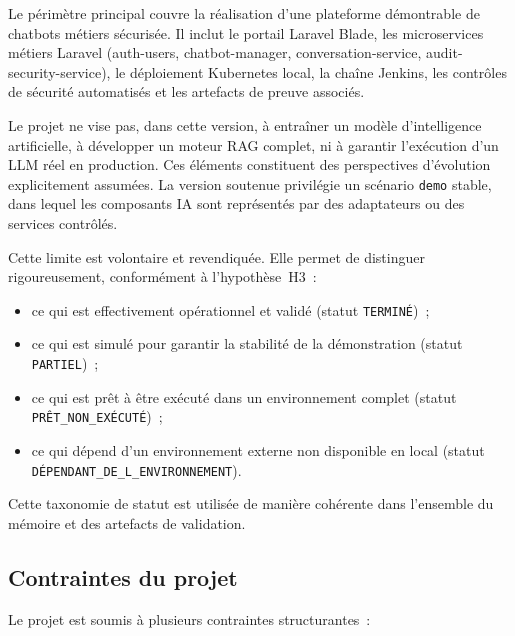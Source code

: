 Le périmètre principal couvre la réalisation d'une plateforme démontrable de chatbots métiers sécurisée. Il inclut le portail Laravel Blade, les microservices métiers Laravel (auth-users, chatbot-manager, conversation-service, audit-security-service), le déploiement Kubernetes local, la chaîne Jenkins, les contrôles de sécurité automatisés et les artefacts de preuve associés.

Le projet ne vise pas, dans cette version, à entraîner un modèle d'intelligence artificielle, à développer un moteur RAG complet, ni à garantir l'exécution d'un LLM réel en production. Ces éléments constituent des perspectives d'évolution explicitement assumées. La version soutenue privilégie un scénario \texttt{demo} stable, dans lequel les composants IA sont représentés par des adaptateurs ou des services contrôlés.

Cette limite est volontaire et revendiquée. Elle permet de distinguer rigoureusement, conformément à l'hypothèse~H3~:

\begin{itemize}
    \item ce qui est effectivement opérationnel et validé (statut \texttt{TERMINÉ})~;
    \item ce qui est simulé pour garantir la stabilité de la démonstration (statut \texttt{PARTIEL})~;
    \item ce qui est prêt à être exécuté dans un environnement complet (statut \texttt{PRÊT\_NON\_EXÉCUTÉ})~;
    \item ce qui dépend d'un environnement externe non disponible en local (statut \texttt{DÉPENDANT\_DE\_L\_ENVIRONNEMENT}).
\end{itemize}

Cette taxonomie de statut est utilisée de manière cohérente dans l'ensemble du mémoire et des artefacts de validation.

\subsection{Contraintes du projet}

Le projet est soumis à plusieurs contraintes structurantes~:

